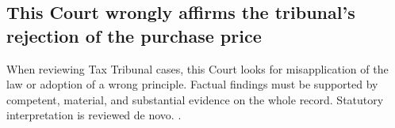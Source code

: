 \documentclass[12pt,\documentclassflag]{michiganCourtOfAppealsBrief}
\begin{document}


\subsection{This Court wrongly affirms the tribunal's rejection of the purchase price}

When reviewing Tax Tribunal cases, this Court looks for misapplication of the law or adoption of a wrong principle. Factual findings must be supported by competent, material, and substantial evidence on the whole record. Statutory interpretation is reviewed de novo. .

\end{document}
